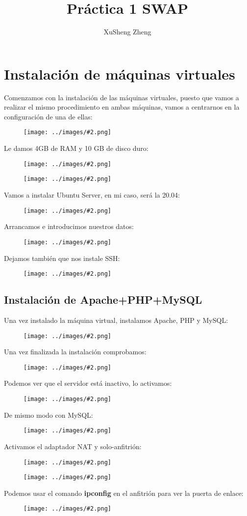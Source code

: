 \documentclass{article}
\title{Práctica 1 SWAP}
\author{XuSheng Zheng}
\date{}
\newcommand{\image}[2]{
\begin{figure}[H]
    \texttt{[image: ../images/\#2.png]}
    \centering
\end{figure}
}
\begin{document}
\maketitle
\tableofcontents
\newpage

\section{Instalación de máquinas virtuales}
Comenzamos con la instalación de las máquinas virtuales, puesto que vamos a realizar el mismo procedimiento en ambas máquinas, vamos a centrarnos en la configuración de una de ellas:
\image{8}{1}
Le damos 4GB de RAM y 10 GB de disco duro:
\image{8}{2}
\image{8}{3}
Vamos a instalar Ubuntu Server, en mi caso, será la 20.04:
\image{8}{4}
Arrancamos e introducimos nuestros datos:
\image{10}{5}
Dejamos también que nos instale SSH:
\image{10}{6}

\subsection{Instalación de Apache+PHP+MySQL}
Una vez instalado la máquina virtual, instalamos Apache, PHP y MySQL:
\image{10}{7}
Una vez finalizada la instalación comprobamos:
\image{10}{8}
Podemos ver que el servidor está inactivo, lo activamos:
\image{10}{9}
De mismo modo con MySQL:
\image{10}{10}

Activamos el adaptador NAT y solo-anfitrión:
\image{8}{11}
\image{8}{12}
Podemos usar el comando \textbf{ipconfig} en el anfitrión para ver la puerta de enlace:
\image{8}{13}
\end{document}
